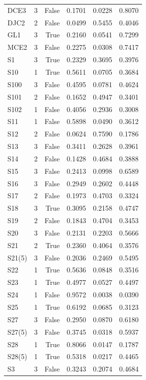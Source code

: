 \begin{longtable}{lrrrrr}
  DCE3 & 3 & False & 0.1701 & 0.0228 & 0.8070 \\
  DJC2 & 2 & False & 0.0499 & 0.5455 & 0.4046 \\
  GL1 & 3 & True & 0.2160 & 0.0541 & 0.7299 \\
  MCE2 & 3 & False & 0.2275 & 0.0308 & 0.7417 \\
  S1 & 3 & True & 0.2329 & 0.3695 & 0.3976 \\
  S10 & 1 & True & 0.5611 & 0.0705 & 0.3684 \\
  S100 & 3 & False & 0.4595 & 0.0781 & 0.4624 \\
  S101 & 2 & False & 0.1652 & 0.4947 & 0.3401 \\
  S102 & 1 & False & 0.4056 & 0.2936 & 0.3008 \\
  S11 & 1 & False & 0.5898 & 0.0490 & 0.3612 \\
  S12 & 2 & False & 0.0624 & 0.7590 & 0.1786 \\
  S13 & 3 & False & 0.3411 & 0.2628 & 0.3961 \\
  S14 & 2 & False & 0.1428 & 0.4684 & 0.3888 \\
  S15 & 3 & False & 0.2413 & 0.0998 & 0.6589 \\
  S16 & 3 & False & 0.2949 & 0.2602 & 0.4448 \\
  S17 & 2 & False & 0.1973 & 0.4703 & 0.3324 \\
  S18 & 3 & True & 0.3095 & 0.2158 & 0.4747 \\
  S19 & 2 & False & 0.1843 & 0.4704 & 0.3453 \\
  S20 & 3 & False & 0.2131 & 0.2203 & 0.5666 \\
  S21 & 2 & True & 0.2360 & 0.4064 & 0.3576 \\
  S21(5) & 3 & False & 0.2036 & 0.2469 & 0.5495 \\
  S22 & 1 & True & 0.5636 & 0.0848 & 0.3516 \\
  S23 & 1 & True & 0.4977 & 0.0527 & 0.4497 \\
  S24 & 1 & False & 0.9572 & 0.0038 & 0.0390 \\
  S25 & 1 & True & 0.6192 & 0.0685 & 0.3123 \\
  S27 & 3 & False & 0.2950 & 0.0870 & 0.6180 \\
  S27(5) & 3 & False & 0.3745 & 0.0318 & 0.5937 \\
  S28 & 1 & True & 0.8066 & 0.0147 & 0.1787 \\
  S28(5) & 1 & True & 0.5318 & 0.0217 & 0.4465 \\
  S3 & 3 & False & 0.3243 & 0.2074 & 0.4684 \\

\end{longtable}
